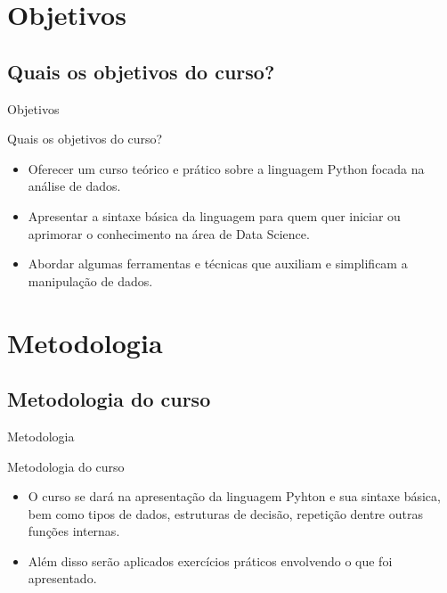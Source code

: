 \section{Objetivos}
\subsection{Quais os objetivos do curso?}
	\begin{frame}{Objetivos}
		
		\begin{block}{Quais os objetivos do curso?}
			\begin{itemize}[<+->]
				
				\item Oferecer um curso teórico e prático sobre a linguagem Python focada na análise de dados.
				
				\item Apresentar a sintaxe básica da linguagem para quem quer iniciar ou aprimorar o conhecimento na área de Data Science.
				
				\item Abordar algumas ferramentas e técnicas que auxiliam e simplificam a manipulação de dados. 
			\end{itemize}
			
		\end{block}
		
	\end{frame}

\section{Metodologia}
\subsection{Metodologia do curso}
	\begin{frame}{Metodologia}
		\begin{block}{Metodologia do curso}
			\begin{itemize}[<+->]
				\item O curso se dará na apresentação da linguagem Pyhton e sua sintaxe básica, bem como tipos de dados, estruturas de decisão, repetição dentre outras funções internas.
				
				\item Além disso serão aplicados exercícios práticos envolvendo o que foi apresentado.
			\end{itemize}
		\end{block}
	\end{frame}

